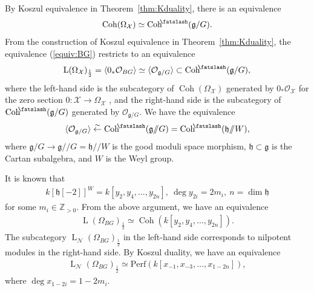 \documentclass [11pt,oneside,a4paper,mathscr]{amsart}
\theoremstyle{definition}
\newcommand{\LL}{\operatorname{L}}
\newcommand{\X}{\mathcal{X}}
\newcommand{\fg}{\mathfrak{g}}
\newcommand{\Coh}{\operatorname{Coh}}
\newcommand{\shear}{{\mathbin{\mkern-6mu\fatslash}}}
\newcommand{\ssslash}{/\!\!/}
\begin{document}
By Koszul equivalence in Theorem~\ref{thm:Kduality}, there is 
an equivalence
\begin{align}\label{equiv:BG}
    \Coh(\Omega_{\X})\simeq\Coh^{\shear}(\mathfrak{g}/G).
\end{align}
From the construction of Koszul equivalence in Theorem~\ref{thm:Kduality}, 
the equivalence (\ref{equiv:BG}) restricts to an equivalence 
\begin{align*}
    \LL(\Omega_{\X})_{\frac{1}{2}}=\langle 0_{*}\mathcal{O}_{BG}\rangle \simeq \langle \mathcal{O}_{\mathfrak{g}/G}\rangle
    \subset \Coh^{\shear}(\mathfrak{g}/G),
\end{align*}
where the left-hand side is the subcategory 
of $\Coh(\Omega_{\X})$ generated by $0_{*}\mathcal{O}_{\X}$ for the 
zero section $0 \colon \X \to \Omega_{\X}$ %
, and the 
right-hand side is the subcategory of $\Coh^{\shear}(\fg/G)$
generated by $\mathcal{O}_{\mathfrak{g}/G}$. 
We have the equivalence 
\begin{align*}
\langle \mathcal{O}_{\mathfrak{g}/G}\rangle    \stackrel{\sim}{\leftarrow} \Coh^{\shear}(\mathfrak{g}\ssslash G)=\Coh^{\shear}(\mathfrak{h}\ssslash W),
\end{align*}
where $\mathfrak{g}/G \to \mathfrak{g}\ssslash G=\mathfrak{h}\ssslash W$ is the good moduli space morphism,
$\mathfrak{h} \subset \fg$ is the Cartan subalgebra, and $W$ is the Weyl group.

It is known that 
\begin{align}\label{cartan}
k[\mathfrak{h}[-2]]^W=k[y_2, y_4, \ldots, y_{2n}], \ \deg y_{2i}=2m_i, \ n=\dim \mathfrak{h}
\end{align}
for some $m_i\in \mathbb{Z}_{>0}$. 
From the above argument, we have an equivalence 
\begin{align*}
    \LL(\Omega_{BG})_{\frac{1}{2}} \simeq \Coh(k[y_2, y_4, \ldots, y_{2n}]). 
\end{align*}
The subcategory $\LL_{\mathcal{N}}(\Omega_{BG})_{\frac{1}{2}}$ in the left-hand side 
corresponds to nilpotent modules in the right-hand side. By Koszul duality, we have an equivalence
\begin{align*}
    \LL_{\mathcal{N}}(\Omega_{BG})_{\frac{1}{2}} \simeq \mathrm{Perf}(k[x_{-1}, x_{-3}, \ldots, x_{1-2n}]), 
\end{align*}
where $\deg x_{1-2i}=1-2m_i$. 


\end{document}

